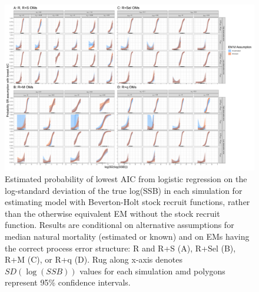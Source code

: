 \documentclass[
  12pt,
]{article}
\begin{document}
\begin{landscape}
\begin{figure}
\begin{center}
\includegraphics{sr_aic_plots}
\end{center}
\caption{Estimated probability of lowest AIC from logistic regression on the log-standard deviation of the true log(SSB) in each simulation for estimating model with Beverton-Holt stock recruit functions, rather than the otherwise equivalent EM without the stock recruit function. Results are conditional on alternative assumptions for median natural mortality (estimated or known) and on EMs having the correct process error structure: R and R+S (A), R+Sel (B), R+M (C), or R+q (D). Rug along x-axis denotes $SD(\log(SSB))$ values for each simulation amd polygons represent 95\% confidence intervals.}\label{sr_aic}
\end{figure}
\end{landscape}
\end{document}

